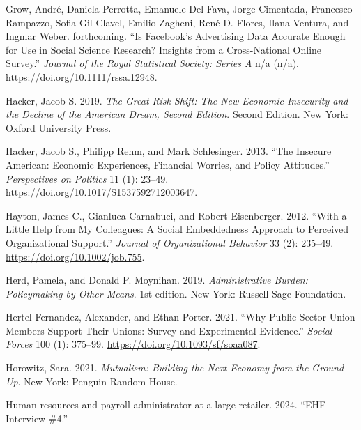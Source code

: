 \documentclass[
  11pt,
  oneside]{article}
\newlength{\cslhangindent}
\newenvironment{CSLReferences}[2] %
 {\begin{list}{}{%
  \setlength{\itemindent}{0pt}
  \setlength{\leftmargin}{0pt}
  \setlength{\parsep}{0pt}
  \ifodd #1
   \setlength{\leftmargin}{\cslhangindent}
   \setlength{\itemindent}{-1\cslhangindent}
  \fi
  \setlength{\itemsep}{#2\baselineskip}}}
 {\end{list}}
\begin{document}
\begin{CSLReferences}{1}{0}
Grow, André, Daniela Perrotta, Emanuele Del Fava, Jorge Cimentada, Francesco Rampazzo, Sofia Gil-Clavel, Emilio Zagheni, René D. Flores, Ilana Ventura, and Ingmar Weber. forthcoming. {``Is {Facebook}'s Advertising Data Accurate Enough for Use in Social Science Research? {Insights} from a Cross-National Online Survey.''} \emph{Journal of the Royal Statistical Society: Series A} n/a (n/a). \url{https://doi.org/10.1111/rssa.12948}.

Hacker, Jacob S. 2019. \emph{The {Great} {Risk} {Shift}: {The} {New} {Economic} {Insecurity} and the {Decline} of the {American} {Dream}, {Second} {Edition}}. Second Edition. New York: Oxford University Press.

Hacker, Jacob S., Philipp Rehm, and Mark Schlesinger. 2013. {``The {Insecure} {American}: {Economic} {Experiences}, {Financial} {Worries}, and {Policy} {Attitudes}.''} \emph{Perspectives on Politics} 11 (1): 23--49. \url{https://doi.org/10.1017/S1537592712003647}.

Hayton, James C., Gianluca Carnabuci, and Robert Eisenberger. 2012. {``With a Little Help from My Colleagues: {A} Social Embeddedness Approach to Perceived Organizational Support.''} \emph{Journal of Organizational Behavior} 33 (2): 235--49. \url{https://doi.org/10.1002/job.755}.

Herd, Pamela, and Donald P. Moynihan. 2019. \emph{Administrative {Burden}: {Policymaking} by {Other} {Means}}. 1st edition. New York: Russell Sage Foundation.

Hertel-Fernandez, Alexander, and Ethan Porter. 2021. {``Why {Public} {Sector} {Union} {Members} {Support} {Their} {Unions}: {Survey} and {Experimental} {Evidence}.''} \emph{Social Forces} 100 (1): 375--99. \url{https://doi.org/10.1093/sf/soaa087}.

Horowitz, Sara. 2021. \emph{Mutualism: {Building} the {Next} {Economy} from the {Ground} {Up}}. New York: Penguin Random House.

Human resources and payroll administrator at a large retailer. 2024. {``{EHF} Interview \#4.''}


\end{CSLReferences}
\end{document}
